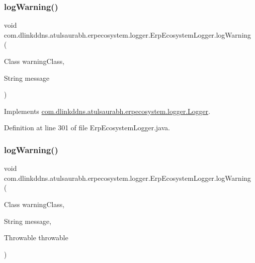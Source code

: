 \subsubsection{\texorpdfstring{log\+Warning()}{logWarning()}\hspace{0.1cm}{\footnotesize\ttfamily [2/3]}}
{\footnotesize\ttfamily void com.\+dlinkddns.\+atulsaurabh.\+erpecosystem.\+logger.\+Erp\+Ecosystem\+Logger.\+log\+Warning (\begin{DoxyParamCaption}\item[{Class}]{warning\+Class,  }\item[{String}]{message }\end{DoxyParamCaption})}



Implements \mbox{\hyperlink{interfacecom_1_1dlinkddns_1_1atulsaurabh_1_1erpecosystem_1_1logger_1_1_logger_aa5df260afe6fcae92f5a9236b3b6a983}{com.\+dlinkddns.\+atulsaurabh.\+erpecosystem.\+logger.\+Logger}}.



Definition at line 301 of file Erp\+Ecosystem\+Logger.\+java.

\mbox{\label{classcom_1_1dlinkddns_1_1atulsaurabh_1_1erpecosystem_1_1logger_1_1_erp_ecosystem_logger_a432114edc56c223b7b5764348641ea24}} 
\subsubsection{\texorpdfstring{log\+Warning()}{logWarning()}\hspace{0.1cm}{\footnotesize\ttfamily [3/3]}}
{\footnotesize\ttfamily void com.\+dlinkddns.\+atulsaurabh.\+erpecosystem.\+logger.\+Erp\+Ecosystem\+Logger.\+log\+Warning (\begin{DoxyParamCaption}\item[{Class}]{warning\+Class,  }\item[{String}]{message,  }\item[{Throwable}]{throwable }\end{DoxyParamCaption})}



